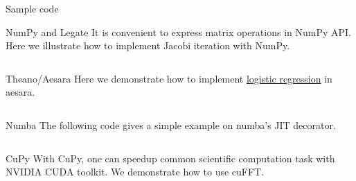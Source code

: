\begin{newSec}{Sample code}
	\begin{newSubsec}{NumPy and Legate}
		It is convenient to express matrix operations in NumPy API. Here we illustrate how to implement Jacobi iteration with NumPy.
		\inputminted{python}{src/numpy.py}
	\end{newSubsec}
	\begin{newSubsec}{Theano/Aesara}
		Here we demonstrate how to implement \href{https://aesara.readthedocs.io/en/latest/tutorial/examples.html#a-real-example-logistic-regression}{logistic regression} in aesara.
		\inputminted{python}{src/theano.py}
	\end{newSubsec}
	\begin{newSubsec}{Numba}
		The following code gives a simple example on numba's JIT decorator.
		\inputminted{python}{src/numba.py}
	\end{newSubsec}
	\begin{newSubsec}{CuPy}
		With CuPy, one can speedup common scientific computation task with NVIDIA CUDA toolkit.
		We demonstrate how to use cuFFT.
		\inputminted{python}{src/cupy.py}
	\end{newSubsec}
\end{newSec}
